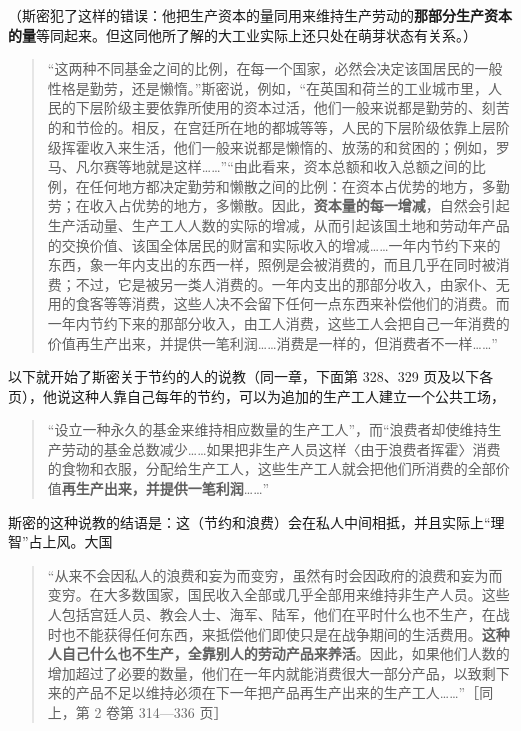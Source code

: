 （斯密犯了这样的错误：他把生产资本的量同用来维持生产劳动的\textbf{那部分生产资本的量}等同起来。但这同他所了解的大工业实际上还只处在萌芽状态有关系。）

\begin{quote}“这两种不同基金之间的比例，在每一个国家，必然会决定该国居民的一般性格是勤劳，还是懒惰。”斯密说，例如，“在英国和荷兰的工业城市里，人民的下层阶级主要依靠所使用的资本过活，他们一般来说都是勤劳的、刻苦的和节俭的。相反，在宫廷所在地的都城等等，人民的下层阶级依靠上层阶级挥霍收入来生活，他们一般来说都是懒惰的、放荡的和贫困的；例如，罗马、凡尔赛等地就是这样……”“由此看来，资本总额和收入总额之间的比例，在任何地方都决定勤劳和懒散之间的比例：在资本占优势的地方，多勤劳；在收入占优势的地方，多懒散。因此，\textbf{资本量的每一增减}，自然会引起生产活动量、生产工人人数的实际的增减，从而引起该国土地和劳动年产品的交换价值、该国全体居民的财富和实际收入的增减……一年内节约下来的东西，象一年内支出的东西一样，照例是会被消费的，而且几乎在同时被消费；不过，它是被另一类人消费的。一年内支出的那部分收入，由家仆、无用的食客等等消费，这些人决不会留下任何一点东西来补偿他们的消费。而一年内节约下来的那部分收入，由工人消费，这些工人会把自己一年消费的价值再生产出来，并提供一笔利润……消费是一样的，但消费者不一样……”\end{quote}

以下就开始了斯密关于节约的人的说教（同一章，下面第 328、329 页及以下各页），他说这种人靠自己每年的节约，可以为追加的生产工人建立一个公共工场，

\begin{quote}“设立一种永久的基金来维持相应数量的生产工人”，而“浪费者却使维持生产劳动的基金总数减少……如果把非生产人员这样〈由于浪费者挥霍〉消费的食物和衣服，分配给生产工人，这些生产工人就会把他们所消费的全部价值\textbf{再生产出来，并提供一笔利润}……”\end{quote}

斯密的这种说教的结语是：这（节约和浪费）会在私人中间相抵，并且实际上“理智”占上风。大国

\begin{quote}“从来不会因私人的浪费和妄为而变穷，虽然有时会因政府的浪费和妄为而变穷。在大多数国家，国民收入全部或几乎全部用来维持非生产人员。这些人包括宫廷人员、教会人士、海军、陆军，他们在平时什么也不生产，在战时也不能获得任何东西，来抵偿他们即使只是在战争期间的生活费用。\textbf{这种人自己什么也不生产，全靠别人的劳动产品来养活}。因此，如果他们人数的增加超过了必要的数量，他们在一年内就能消费很大一部分产品，以致剩下来的产品不足以维持必须在下一年把产品再生产出来的生产工人……”［同上，第 2 卷第 314—336 页］\end{quote}

